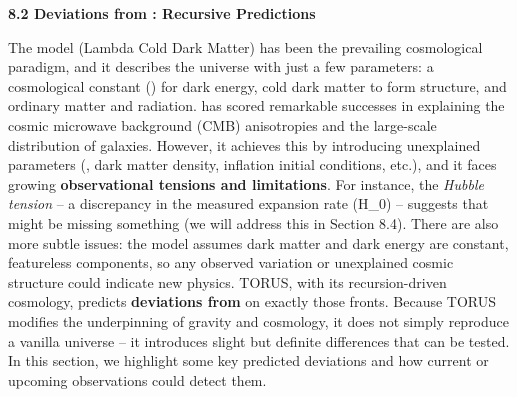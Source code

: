\documentclass[
]{article}
\begin{document}
{\textbf{8.2 Deviations from \LambdaCDM: Recursive Predictions}

The \LambdaCDM model (Lambda Cold Dark Matter) has been the prevailing
cosmological paradigm, and it describes the universe with just a few
parameters: a cosmological constant (\Lambda) for dark energy, cold dark
matter to form structure, and ordinary matter and radiation. \LambdaCDM has
scored remarkable successes in explaining the cosmic microwave
background (CMB) anisotropies and the large-scale distribution of
galaxies. However, it achieves this by introducing unexplained
parameters (\Lambda, dark matter density, inflation initial conditions, etc.),
and it faces growing \textbf{observational tensions and limitations}.
For instance, the \emph{Hubble tension} -- a discrepancy in the measured
expansion rate (H_{0}) --
suggests that \LambdaCDM might be missing something (we will address this in
Section 8.4). There are also more subtle issues: the model assumes dark
matter and dark energy are constant, featureless components, so any
observed variation or unexplained cosmic structure could indicate new
physics. TORUS, with its recursion-driven cosmology, predicts
\textbf{deviations from \LambdaCDM} on exactly those fronts. Because TORUS
modifies the underpinning of gravity and cosmology, it does not simply
reproduce a vanilla \LambdaCDM universe -- it introduces slight but definite
differences that can be tested. In this section, we highlight some key
predicted deviations and how current or upcoming observations could
detect them.

}
\end{document}
